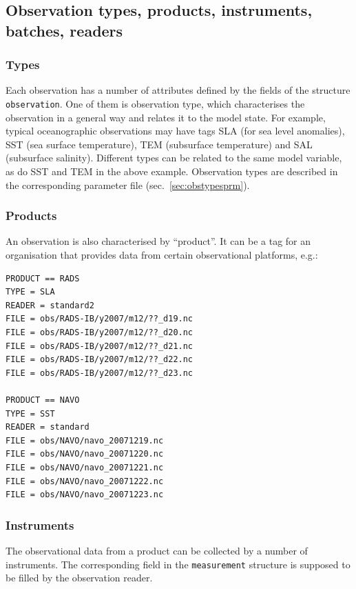 \documentclass[11pt]{report}
\begin{document}
\subsection{Observation types, products, instruments, batches, readers}

\subsubsection{Types}
\label{sec:types}

Each observation has a number of attributes defined by the fields of the structure \verb|observation|.
One of them is observation type, which characterises the observation in a general way and relates it to the model state.
For example, typical oceanographic observations may have tags SLA (for sea level anomalies), SST (sea surface temperature), TEM (subsurface temperature) and SAL (subsurface salinity).
Different types can be related to the same model variable, as do SST and TEM in the above example.
Observation types are described in the corresponding parameter file (sec.~\ref{sec:obstypesprm}).

\subsubsection{Products}

An observation is also characterised by ``product''.
It can be a tag for an organisation that provides data from certain observational platforms, e.g.:
\begin{Verbatim}[frame=single,fontsize=\footnotesize]
PRODUCT == RADS
TYPE = SLA
READER = standard2
FILE = obs/RADS-IB/y2007/m12/??_d19.nc
FILE = obs/RADS-IB/y2007/m12/??_d20.nc
FILE = obs/RADS-IB/y2007/m12/??_d21.nc
FILE = obs/RADS-IB/y2007/m12/??_d22.nc
FILE = obs/RADS-IB/y2007/m12/??_d23.nc

PRODUCT == NAVO
TYPE = SST
READER = standard
FILE = obs/NAVO/navo_20071219.nc
FILE = obs/NAVO/navo_20071220.nc
FILE = obs/NAVO/navo_20071221.nc
FILE = obs/NAVO/navo_20071222.nc
FILE = obs/NAVO/navo_20071223.nc
\end{Verbatim}

\subsubsection{Instruments}

The observational data from a product can be collected by a number of instruments.
The corresponding field in the \verb|measurement| structure is supposed to be filled by the observation reader.
\end{document}
